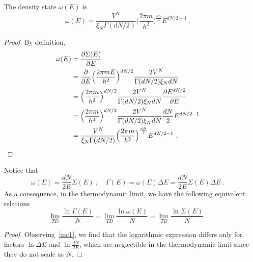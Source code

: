     The density state $\omega(E)$ is
    \begin{equation*}
        \omega (E) = \frac{V^N}{\xi_N \Gamma(dN/2)} \Big ( \frac{2 \pi m}{h^2} \Big )^{\frac{dN}{2}} E^{dN/2-1} ~.
    \end{equation*}
    \begin{proof}
        By definition, 
        \begin{equation*}
        \begin{aligned}
            \omega (E) &= \frac{\partial\Sigma (E)}{\partial E} \\ & = \frac{\partial}{\partial E} \Big (\frac{2 \pi m E}{h^2} \Big)^{dN/2} \frac{2 V^N}{\Gamma (dN/2)\xi_N d N} \\ & = \Big (\frac{2 \pi m}{h^2} \Big)^{dN/2} \frac{2 V^N}{\Gamma (dN/2)\xi_N d N} \frac{\partial E^{dN/2}}{\partial E} \\ & = \Big (\frac{2 \pi m}{h^2} \Big)^{dN/2} \frac{2 V^N}{\Gamma (dN/2)\xi_N d N} \frac{dN}{2} E^{dN/2 - 1} \\ & = \frac{V^N}{\xi_N \Gamma(dN/2)} \Big ( \frac{2 \pi m}{h^2} \Big )^{\frac{dN}{2}} E^{dN/2-1} ~.
        \end{aligned}
        \end{equation*}
    \end{proof}

    Notice that 
    \begin{equation}\label{mc1}
        \omega(E) = \frac{dN}{2E} \Sigma(E) ~, \quad \Gamma(E) = \omega(E) \Delta E = \frac{dN}{2E} \Sigma(E) \Delta E ~.
    \end{equation}
    As a consequence, in the thermodynamic limit, we have the following equivalent relations
    \begin{equation*}
        \lim_{TD} \frac{\ln \Gamma (E)}{N} = \lim_{TD} \frac{\ln \omega (E)}{N} = \lim_{TD} \frac{\ln \Sigma (E)}{N} ~.
    \end{equation*}
    \begin{proof}
        Observing~\eqref{mc1}, we find that the logarithmic expression differs only for factors $\ln \Delta E$ and $\ln \frac{dN}{2E}$, which are neglectible in the thermodynamic limit since they do not scale as $N$.
    \end{proof}

